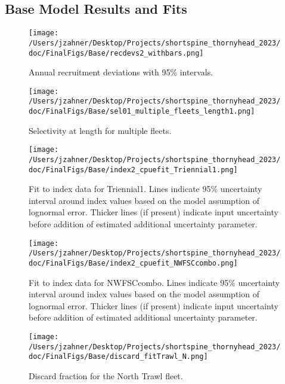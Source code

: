\documentclass[11pt,
  english,
  letterpaper,
]{article}
\begin{document}
\clearpage

\hypertarget{base-model-results-and-fits}{%
\subsection{Base Model Results and Fits}\label{base-model-results-and-fits}}

\begin{figure}
\centering
\texttt{[image: /Users/jzahner/Desktop/Projects/shortspine\_thornyhead\_2023/doc/FinalFigs/Base/recdevs2\_withbars.png]}
\caption{Annual recruitment deviations with 95\% intervals.\label{fig:recdevs}}
\end{figure}

\begin{figure}
\centering
\texttt{[image: /Users/jzahner/Desktop/Projects/shortspine\_thornyhead\_2023/doc/FinalFigs/Base/sel01\_multiple\_fleets\_length1.png]}
\caption{Selectivity at length for multiple fleets.\label{fig:selcurvs}}
\end{figure}

\begin{figure}
\centering
\texttt{[image: /Users/jzahner/Desktop/Projects/shortspine\_thornyhead\_2023/doc/FinalFigs/Base/index2\_cpuefit\_Triennial1.png]}
\caption{Fit to index data for Triennial1. Lines indicate 95\% uncertainty interval around index values based on the model assumption of lognormal error. Thicker lines (if present) indicate input uncertainty before addition of estimated additional uncertainty parameter.\label{fig:fitsTri1}}
\end{figure}

\begin{figure}
\centering
\texttt{[image: /Users/jzahner/Desktop/Projects/shortspine\_thornyhead\_2023/doc/FinalFigs/Base/index2\_cpuefit\_NWFSCcombo.png]}
\caption{Fit to index data for NWFSCcombo. Lines indicate 95\% uncertainty interval around index values based on the model assumption of lognormal error. Thicker lines (if present) indicate input uncertainty before addition of estimated additional uncertainty parameter.\label{fig:fitscombo}}
\end{figure}

\begin{figure}
\centering
\texttt{[image: /Users/jzahner/Desktop/Projects/shortspine\_thornyhead\_2023/doc/FinalFigs/Base/discard\_fitTrawl\_N.png]}
\caption{Discard fraction for the North Trawl fleet.\label{fig:northtrl_disc}}
\end{figure}
\end{document}
